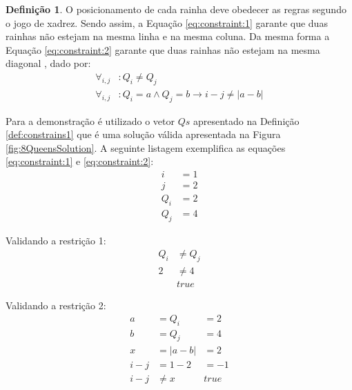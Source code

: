 \documentclass[12pt]{article}
\theoremstyle{definition}
\newtheorem{defn}{Definição}[section]
\begin{document}
\begin{defn}
\label{def:constrains2}
O posicionamento de cada rainha deve obedecer  as regras segundo o jogo de xadrez.
 Sendo assim, a Equação \ref{eq:constraint:1} garante que duas rainhas não 
 estejam na mesma linha e na mesma coluna. Da mesma forma a Equação \ref{eq:constraint:2} garante 
que duas rainhas não estejam na mesma diagonal \cite{Tsang93}, dado por:
\begin{subequations}
\begin{align}
\label{eq:constraint:1} \forall_{i, j} & : Q_{i} \neq Q_{j} \\
\label{eq:constraint:2} \forall_{i, j} & : Q_{i} = a \wedge Q_{j} = b \rightarrow i - j \neq \left| a - b \right|
\end{align}
\end{subequations}
\end{defn}

Para a demonstração é utilizado o vetor $Qs$ apresentado na Definição \ref{def:constrains1} que é uma solução válida apresentada na Figura \ref{fig:8QueensSolution}. A seguinte listagem exemplifica as equações \ref{eq:constraint:1} e \ref{eq:constraint:2}:
\begin{subequations}
\begin{align}
i & = 1 \\
j & = 2 \\
Q_{i} & = 2 \\
Q_{j} & = 4
\end{align}
\end{subequations}

Validando a restrição 1:
\begin{subequations}
\begin{align}
Q_{i} & \neq Q_{j} \\
2 & \neq 4 \\
& true
\end{align}
\end{subequations}

Validando a restrição 2:
\begin{subequations}
\begin{align}
a & = Q_{i} & = 2 \\
b & = Q_{j} & = 4 \\
x & = |a - b| & = 2 \\
i - j & = 1 - 2 & = -1 \\
i - j & \neq x & true
\end{align}
\end{subequations}
\end{document}
